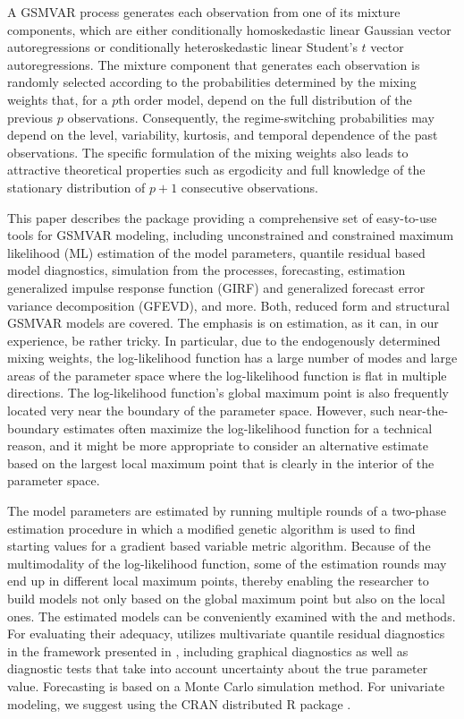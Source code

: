 \documentclass[nojss]{jss}
\begin{document}
A GSMVAR process generates each observation from one of its mixture components, which are either conditionally homoskedastic linear Gaussian vector autoregressions or conditionally heteroskedastic linear Student's $t$ vector autoregressions. The mixture component that generates each observation is randomly selected according to the probabilities determined by the mixing weights that, for a $p$th order model, depend on the full distribution of the previous $p$ observations. Consequently, the regime-switching probabilities may depend on the level, variability, kurtosis, and temporal dependence of the past observations. The specific formulation of the mixing weights also leads to attractive theoretical properties such as ergodicity and full knowledge of the stationary distribution of $p+1$ consecutive observations.

This paper describes the  package  providing a comprehensive set of easy-to-use tools for GSMVAR modeling, including unconstrained and constrained maximum likelihood (ML) estimation of the model parameters, quantile residual based model diagnostics, simulation from the processes, forecasting, estimation generalized impulse response function (GIRF) and generalized forecast error variance decomposition (GFEVD), and more. Both, reduced form and structural GSMVAR models are covered. The emphasis is on estimation, as it can, in our experience, be rather tricky. In particular, due to the endogenously determined mixing weights, the log-likelihood function has a large number of modes and large areas of the parameter space where the log-likelihood function is flat in multiple directions. The log-likelihood function's global maximum point is also frequently located very near the boundary of the parameter space. However, such near-the-boundary estimates often maximize the log-likelihood function for a technical reason, and it might be more appropriate to consider an alternative estimate based on the largest local maximum point that is clearly in the interior of the parameter space.

The model parameters are estimated by running multiple rounds of a two-phase estimation procedure in which a modified genetic algorithm is used to find starting values for a gradient based variable metric algorithm. Because of the multimodality of the log-likelihood function, some of the estimation rounds may end up in different local maximum points, thereby enabling the researcher to build models not only based on the global maximum point but also on the local ones. The estimated models can be conveniently examined with the  and  methods. For evaluating their adequacy,  utilizes multivariate quantile residual diagnostics in the framework presented in \cite{Kalliovirta+Saikkonen:2010}, including graphical diagnostics as well as diagnostic tests that take into account uncertainty about the true parameter value. Forecasting is based on a Monte Carlo simulation method. For univariate modeling, we suggest using the CRAN distributed R package  \citep{uGMAR}.
\end{document}
